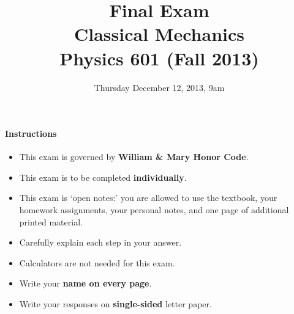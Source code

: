 \documentclass[letterpaper,11pt]{article}
\title{Final Exam \\ Classical Mechanics \\ Physics 601 (Fall 2013)}
\date{Thursday December 12, 2013, 9am}
\begin{document}
\maketitle

\paragraph*{Instructions}
\begin{itemize}
 \item This exam is governed by \textbf{William \& Mary Honor Code}.
 \item This exam is to be completed \textbf{individually}.
 \item This exam is `open notes:' you are allowed to use the textbook, your homework assignments, your personal notes, and one page of additional printed material.
 \item Carefully explain each step in your answer.
 \item Calculators are not needed for this exam.
 \item Write your \textbf{name on every page}.
 \item Write your responses on \textbf{single-sided} letter paper.
\end{itemize}

\pagebreak
\end{document}
